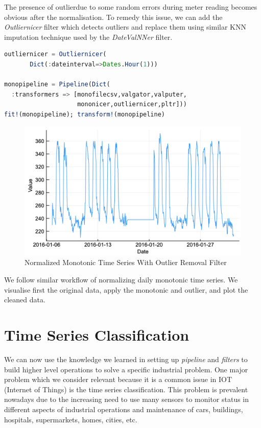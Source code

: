 \documentclass{juliacon}
\begin{document}
The presence of outlierdue to some random errors during meter reading  becomes obvious after the normalisation. To remedy this issue, we can add the \emph{Outliernicer} filter which detects outliers and replace them using similar KNN imputation technique used by the \emph{DateValNNer} filter.

\begin{lstlisting}[language = Julia]
outliernicer = Outliernicer(
       Dict(:dateinterval=>Dates.Hour(1)))

monopipeline = Pipeline(Dict(
  :transformers => [monofilecsv,valgator,valputer,
                    mononicer,outliernicer,pltr]))
fit!(monopipeline); transform!(monopipeline)
\end{lstlisting}

\begin{figure}[htbp]
   \centering
   \includegraphics[width=\columnwidth]{outnicer.png} %
   \caption{Normalized Monotonic Time Series With Outlier Removal Filter}
   \label{fig:outnicer}
\end{figure}

We follow similar workflow of normalizing daily monotonic time series. We visualise first the original data, apply the monotonic and outlier, and plot the cleaned data.



\section{Time Series Classification}

We can now use the knowledge we learned in setting up 
\emph{pipeline} and \emph{filters} to build higher level
operations to solve a specific industrial problem. One major problem
which we consider relevant because it is a common issue in IOT (Internet of Things) 
 is the time series classification. This problem is prevalent nowadays 
due to the increasing need to use many sensors to monitor status in different aspects of industrial
operations and maintenance of cars, buildings, hospitals, supermarkets, homes, cities, etc.
\end{document}
